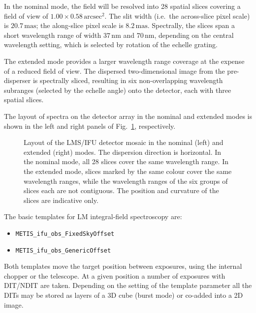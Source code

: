 In the nominal mode, the field will be resolved into 28 spatial slices
covering a field of view of $1.00\times0.58\,\mathrm{arcsec^{2}}$.
The slit width (i.e.\ the across-slice pixel scale) is
$20.7\,\mathrm{mas}$; the along-slice pixel scale is
$8.2\,\mathrm{mas}$. Spectrally, the slices span a short wavelength
range of width $37\,\mathrm{nm}$ and $70\,\mathrm{nm}$, depending on
the central wavelength setting, which is selected by rotation of the
echelle grating.

The extended mode provides a larger wavelength range coverage at the
expense of a reduced field of view. The dispersed two-dimensional
image from the pre-disperser is spectrally sliced, resulting in six
non-overlapping wavelength subranges (selected by the echelle angle)
onto the detector, each with three spatial slices.

The layout of spectra on the detector array in the nominal and
extended modes is shown in the left and right panels of
Fig.~\ref{fig:IFU_detector_layout}, respectively.

\begin{figure}[ht]
  \centering
  \hfill
  \caption[LMS detector layout]{Layout of the LMS/IFU detector mosaic
    in the nominal (left) and extended (right) modes. The dispersion
    direction is horizontal. In the nominal mode, all 28 slices cover
    the same wavelength range. In the extended mode, slices marked by
    the same colour cover the same wavelength ranges, while the
    wavelength ranges of the six groups of slices each are not
    contiguous. The position and curvature of the slices are
    indicative only. }
  \label{fig:IFU_detector_layout}
\end{figure}

The basic templates for LM integral-field spectroscopy are:
\begin{itemize}
\item \lstinline{METIS_ifu_obs_FixedSkyOffset}
\item \lstinline{METIS_ifu_obs_GenericOffset}
\end{itemize}
Both templates move the target position between exposures, using the
internal chopper or the telescope. At a given position a number of
exposures with DIT/NDIT are taken. Depending on the setting of the
template parameter  all the DITs may be stored as
layers of a 3D cube (burst mode) or co-added into a 2D image.


